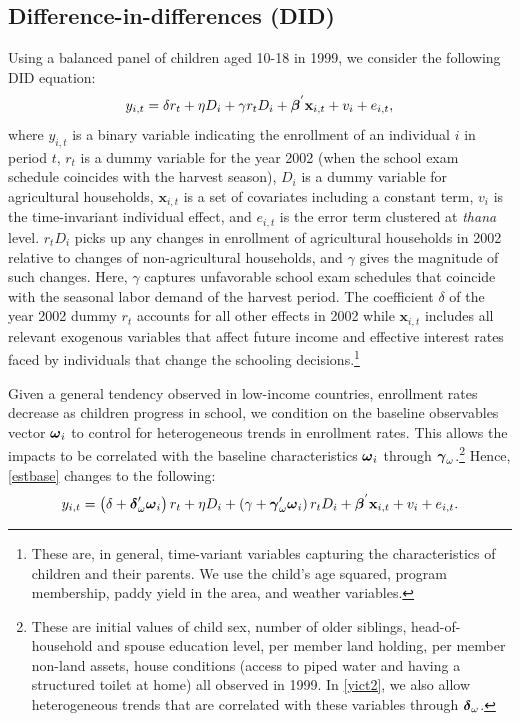 \documentclass[12pt,letterpaper]{article}
\newcommand{\bfbeta}{\ensuremath{\mbox{\boldmath $\beta$}}}
\newcommand{\bfgamma}{\ensuremath{\mbox{\boldmath $\gamma$}}}
\newcommand{\bfdelta}{\ensuremath{\mbox{\boldmath $\delta$}}}
\newcommand{\bfomega}{\ensuremath{\mbox{\boldmath $\omega$}}}
\newcommand{\0}{\ensuremath{\mbox{\boldmath $0$}}}
\begin{document}
\subsection{Difference-in-differences (DID)}

Using a balanced panel of children aged 10-18 in 1999, we consider the following DID equation:
\begin{equation}
y_{i,t} = \delta r_{t} + \eta D_{i} + \gamma r_{t}D_{i} + \bfbeta^{'} \textbf{x}_{i,t} + v_{i} + e_{i,t},
\label{estbase}
\end{equation}
where $y_{i,t}$ is a binary variable indicating the enrollment of an individual $i$ in period $t$, $r_{t}$ is a dummy variable for the year 2002 (when the school exam schedule coincides with the harvest season), $D_{i}$ is a dummy variable for agricultural households, $\textbf{x}_{i,t}$ is a set of covariates including a constant term,  $v_{i}$ is the time-invariant individual effect, and $e_{i,t}$ is the error term clustered at \textit{thana} level. $r_{t}D_{i}$ picks up any changes in enrollment of agricultural households in 2002 relative to changes of non-agricultural households, and $\gamma$ gives the magnitude of such changes. Here, $\gamma$ captures unfavorable school exam schedules that coincide with the seasonal labor demand of the harvest period. The coefficient $\delta$ of the year 2002 dummy $r_{t}$ accounts for all other effects in 2002 while $\textbf{x}_{i,t}$ includes all relevant exogenous variables that affect future income and effective interest rates faced by individuals that change the schooling decisions.\footnote{These are, in general, time-variant variables capturing the characteristics of children and their parents. We use the child's age squared, program membership, paddy yield in the area, and weather variables. }

Given a general tendency observed in low-income countries, enrollment rates decrease as children progress in school, we condition on the baseline observables vector $\bfomega_{i}$ to control for heterogeneous trends in enrollment rates. This allows the impacts to be correlated with the baseline characteristics $\bfomega_{i}$ through $\bfgamma_{\omega}$.\footnote{These are initial values of child sex, number of older siblings, head-of-household and spouse education level, per member land holding, per member non-land assets, house conditions (access to piped water and having a structured toilet at home) all observed in 1999. In \eqref{yict2}, we also allow heterogeneous trends that are correlated with these variables through $\bfdelta_{\omega}$. }
Hence, \eqref{estbase} changes to the following:
\begin{equation}
y_{i,t} = 
\left(\delta +\bfdelta'_{\omega}\bfomega_{i}\right)r_{t} + \eta D_{i} +
\left(\gamma + \bfgamma'_{\omega}\bfomega_{i}\right)r_{t}D_{i} + 
\bfbeta^{'}\textbf{x}_{i,t} + v_{i} + e_{i,t}.
\label{yict2}
\end{equation}
\end{document}
